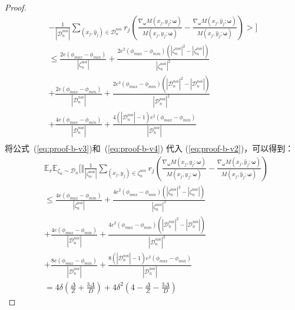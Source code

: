 \begin{proof}
\begin{multline}
    -\frac{1}{|\mathcal{D}_n^{noi}|}\sum_{\left(x_j,\hat{y}_j\right)\in \mathcal{D}_n^{noi}}r_j\left(\frac{\nabla_{\boldsymbol{\omega}} M\left(x_j, y_j; \boldsymbol{\omega}\right)}{M\left(x_j, y_j; \boldsymbol{\omega}\right)} -\frac{\nabla_{\boldsymbol{\omega}} M\left(x_j, \hat{y}_j; \boldsymbol{\omega}\right)}{M\left(x_j, \hat{y}_j; \boldsymbol{\omega}\right)}\right)>\Biggl]\\
    \leq \frac{2e\left(\phi_{max}-\phi_{min}\right)}{|\zeta_n^{noi}|}+\frac{2e^2\left(\phi_{max}-\phi_{min}\right)\left(|\zeta_n^{noi}|^2-|\zeta_n^{noi}|\right)}{|\zeta_n^{noi}|^2}\\
    +\frac{2e\left(\phi_{max}-\phi_{min}\right)}{|\mathcal{D}_n^{noi}|}+\frac{2e^2\left(\phi_{max}-\phi_{min}\right)\left(|\mathcal{D}_n^{noi}|^2-|\mathcal{D}_n^{noi}|\right)}{|\mathcal{D}_n^{noi}|^2}\\
    +\frac{4e\left(\phi_{max}-\phi_{min}\right)}{|\mathcal{D}_n^{noi}|}+\frac{4\left(|\mathcal{D}_n^{noi}|-1\right)e^2\left(\phi_{max}-\phi_{min}\right)}{|\mathcal{D}_n^{noi}|}\\
\end{multline}
将公式~(\ref{eq:proof-b-v3})和~(\ref{eq:proof-b-v4}) 代入 (\ref{eq:proof-b-v2})，可以得到：
\begin{equation}\label{eq:proof-b-v5}
\begin{aligned}
    &\mathbb{E}_{r}\mathbb{E}_{\zeta_n\sim \mathcal{D}_n}\Biggl[\Vert\frac{1}{|\zeta_n^{noi}|}\sum_{\left(x_j,\hat{y}_j\right)\in \zeta_n^{noi}}r_j\left(\frac{\nabla_{\boldsymbol{\omega}} M\left(x_j,y_j;\boldsymbol{\omega}\right)}{M\left(x_j,y_j;\boldsymbol{\omega}\right)} -\frac{\nabla_{\boldsymbol{\omega}} M\left(x_j,\hat{y}_j;\boldsymbol{\omega}\right)}{M\left(x_j,\hat{y}_j;\boldsymbol{\omega}\right)}\right)\\
    &\leq \frac{4e\left(\phi_{max}-\phi_{min}\right)}{|\zeta_n^{noi}|}+\frac{4e^2\left(\phi_{max}-\phi_{min}\right)\left(|\zeta_n^{noi}|^2-|\zeta_n^{noi}|\right)}{|\zeta_n^{noi}|^2}\\
    &+\frac{4e\left(\phi_{max}-\phi_{min}\right)}{|\mathcal{D}_n^{noi}|}+\frac{4e^2\left(\phi_{max}-\phi_{min}\right)\left(|\mathcal{D}_n^{noi}|^2-|\mathcal{D}_n^{noi}|\right)}{|\mathcal{D}_n^{noi}|^2}\\
    &+\frac{8e\left(\phi_{max}-\phi_{min}\right)}{|\mathcal{D}_n^{noi}|}+\frac{8\left(|\mathcal{D}_n^{noi}|-1\right)e^2\left(\phi_{max}-\phi_{min}\right)}{|\mathcal{D}_n^{noi}|}\\
&=4\delta\left(\frac{\Delta}{Z}+\frac{3\Delta}{D}\right)+4\delta^2\left(4-\frac{\Delta}{Z}-\frac{3\Delta}{D}\right)   
\end{aligned}
\end{equation}



\end{proof}
